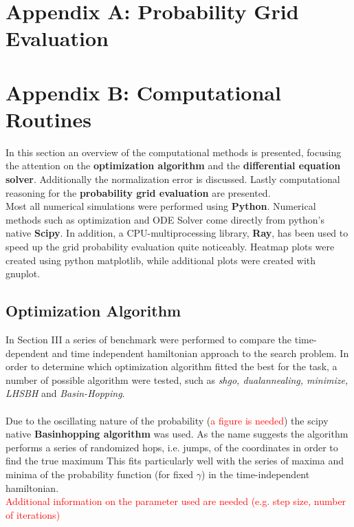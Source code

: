\documentclass[11pt, twoside]{report}
\newcommand{\red}[1]{\textcolor{red}{#1}}
\begin{document}
\section*{Appendix A: Probability Grid Evaluation}
\section*{Appendix B: Computational Routines}
In this section an overview of the computational methods is presented, focusing the attention on the \textbf{optimization algorithm} and the \textbf{differential equation solver}. Additionally the normalization error is discussed. Lastly computational reasoning for the \textbf{probability grid evaluation} are presented. \\

Most all numerical simulations were performed using \textbf{Python}. Numerical methods such as optimization and ODE Solver come directly from python's native \textbf{Scipy}. In addition, a CPU-multiprocessing library, \textbf{Ray}, has been used to speed up the grid probability evaluation quite noticeably. Heatmap plots were created using python matplotlib, while additional plots were created with gnuplot.

\subsection{Optimization Algorithm}
In Section III a series of benchmark were performed to compare the time-dependent and time independent hamiltonian approach to the search problem. In order to determine which optimization algorithm fitted the best for the task, a number of possible algorithm were tested, such as \textit{shgo, dualannealing, minimize, LHSBH} and \textit{Basin-Hopping}.\\ \\
Due to the oscillating nature of the probability (\red{a figure is needed}) the scipy native \textbf{Basinhopping algorithm} was used. As the name suggests the algorithm performs a series of randomized hops, i.e. jumps, of the coordinates in order to find the true maximum This fits particularly well with the series of maxima and minima of the probability function (for fixed $\gamma$) in the time-independent hamiltonian. \\\red{Additional information on the parameter used are needed (e.g. step size, number of iterations)}
\end{document}
